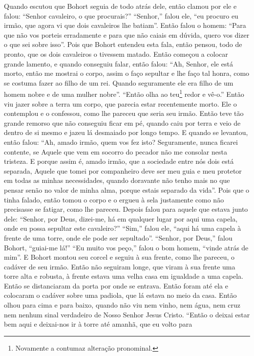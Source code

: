 Quando escutou que Bohort seguia de todo atrás dele, então clamou por ele e
falou: “Senhor cavaleiro, o que procurais?” “Senhor,” falou ele, “eu procuro
eu irmão, que agora vi que dois cavaleiros lhe batiam”. Então falou o homem:
“Para que não vos porteis erradamente e para que não caiais em dúvida, quero
vos dizer o que sei sobre isso”. Pois que Bohort entendeu esta fala, então
pensou, todo de pronto, que os dois cavaleiros o tivessem matado. Então começou
a colocar grande lamento, e quando conseguiu falar, então falou: “Ah, Senhor,
ele está morto, então me mostrai o corpo, assim o faço sepultar e lhe faço tal
honra, como se costuma fazer ao filho de um rei. Quando seguramente ele era
filho de um homem nobre e de uma mulher nobre”. “Então olha ao
teu\footnote{ Novamente a contumaz alteração pronominal.}  redor e
vê-o.” Então viu jazer sobre a terra um corpo, que parecia estar recentemente
morto. Ele o contemplou e o confessou, como lhe pareceu que seria seu irmão.
Então teve tão grande remorso que não conseguiu ficar em pé, quando caiu por
terra e veio de dentro de si mesmo e jazeu lá desmaiado por longo tempo. E
quando se levantou, então falou: “Ah, amado irmão, quem vos fez isto?
Seguramente, nunca ficarei contente, se Aquele que vem em socorro do pecador
não me consolar nesta tristeza. E porque assim é, amado irmão, que a sociedade
entre nós dois está separada, Aquele que tomei por companheiro deve ser meu
guia e meu protetor em todas as minhas necessidades, quando doravante não tenho
mais no que pensar senão no valor de minha alma, porque estais separado da
vida”. Pois que o tinha falado, então tomou o corpo e o ergueu à sela
justamente como não precisasse se fatigar, como lhe pareceu. Depois falou para
aquele que estava junto dele: “Senhor, por Deus, dizei-me, há em qualquer lugar
por aqui uma capela, onde eu possa sepultar este cavaleiro?” “Sim,” falou ele,
“aqui há uma capela à frente de uma torre, onde ele pode ser sepultado”.
“Senhor, por Deus,” falou Bohort, “guiai-me lá!” “Eu muito vos peço,” falou o
bom homem, “vinde atrás de mim”. E Bohort montou seu corcel e seguiu à sua
frente, como lhe pareceu, o cadáver de seu irmão. Então não seguiram longe, que
viram à sua frente uma torre alta e robusta, à frente estava uma velha casa em
igualdade a uma capela. Então se distanciaram da porta por onde se entrava.
Então foram até ela e colocaram o cadáver sobre uma padiola, que lá estava no
meio da casa. Então olhou para cima e para baixo, quando não viu nem vinho, nem
água, nem cruz nem nenhum sinal verdadeiro de Nosso Senhor Jesus Cristo. “Então
o deixai estar bem aqui e deixai-nos ir à torre até amanhã, que eu volto para
